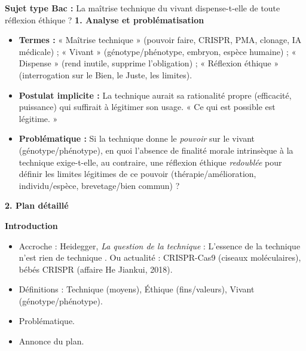 \documentclass[11pt]{article}
\begin{document}
\begin{exoresolu}
    \textbf{Sujet type Bac :} \guillemotleft La maîtrise technique du vivant dispense-t-elle de toute réflexion éthique ? \guillemotright
    \tcblower
    \textbf{1. Analyse et problématisation}
    \begin{itemize}
        \item \textbf{Termes :} « Maîtrise technique » (pouvoir faire, CRISPR, PMA, clonage, IA médicale) ; « Vivant » (génotype/phénotype, embryon, espèce humaine) ; « Dispense » (rend inutile, supprime l'obligation) ; « Réflexion éthique » (interrogation sur le Bien, le Juste, les limites).
        \item \textbf{Postulat implicite :} La technique aurait sa rationalité propre (efficacité, puissance) qui suffirait à légitimer son usage. « Ce qui est possible est légitime. »
        \item \textbf{Problématique :} Si la technique donne le \emph{pouvoir} sur le vivant (génotype/phénotype), en quoi l'absence de finalité morale intrinsèque à la technique exige-t-elle, au contraire, une réflexion éthique \emph{redoublée} pour définir les limites légitimes de ce pouvoir (thérapie/amélioration, individu/espèce, brevetage/bien commun) ?
    \end{itemize}

    \textbf{2. Plan détaillé}

    \textbf{Introduction}
    \begin{itemize}
        \item Accroche : Heidegger, \emph{La question de la technique} : \guillemotleft L'essence de la technique n'est rien de technique \guillemotright. Ou actualité : CRISPR-Cas9 (ciseaux moléculaires), bébés CRISPR (affaire He Jiankui, 2018).
        \item Définitions : Technique (moyens), Éthique (fins/valeurs), Vivant (génotype/phénotype).
        \item Problématique.
        \item Annonce du plan.
    \end{itemize}


\end{exoresolu}
\end{document}
